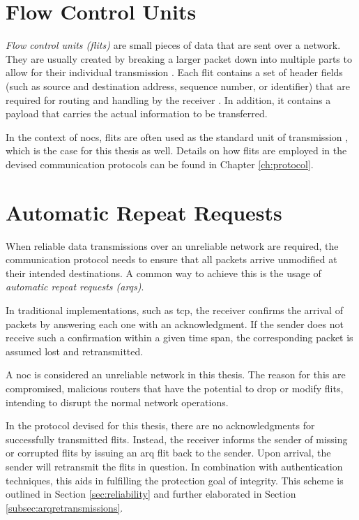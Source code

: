\section{Flow Control Units}\label{sec:flitsfun}
\textit{Flow control units (flits)} are small pieces of data that are sent over a network. They are usually created by breaking a larger
packet down into multiple parts to allow for their individual transmission \cite[6]{flitslecturecmu}. Each flit contains a set of header fields (such as source and
destination address, sequence number, or identifier) that are required for routing and handling by the receiver \cite[2]{flitslectureutah}.
In addition, it contains a payload that carries the actual information to be transferred.

In the context of \glspl{noc}, flits are often used as the standard unit of transmission \cite[51\psqq]{tatas16designingnocs}, which is the case for
this thesis as well. Details on how flits are employed in the devised communication protocols can be found in Chapter \ref{ch:protocol}.

\section{Automatic Repeat Requests}\label{sec:arqs}
When reliable data transmissions over an unreliable network are required, the communication protocol needs to ensure that all packets arrive unmodified
at their intended destinations. A common way to achieve this is the usage of \textit{automatic repeat requests (\glspl{arq})}.

In traditional implementations, such as \gls{tcp}, the receiver confirms the arrival of packets by answering each one with an acknowledgment.
If the sender does not receive such a confirmation within a given time span, the corresponding packet is assumed lost and retransmitted.

A \gls{noc} is considered an unreliable network in this thesis. The reason for this are compromised, malicious routers that have the potential to drop
or modify flits, intending to disrupt the normal network operations.

In the protocol devised for this thesis, there are no acknowledgments for successfully transmitted flits. Instead, the receiver informs the sender of
missing or corrupted flits by issuing an \gls{arq} flit back to the sender. Upon arrival, the sender will retransmit the flits in question. In
combination with authentication techniques, this aids in fulfilling the protection goal of integrity. This scheme is outlined in Section
\ref{sec:reliability} and further elaborated in Section \ref{subsec:arqretransmissions}.


